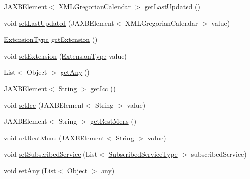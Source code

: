 \begin{DoxyCompactItemize}
\item 
JAXBElement$<$ XMLGregorianCalendar $>$ \hyperlink{classcom_1_1telefonica_1_1schemas_1_1unica_1_1rest_1_1directory_1_1v1_1_1UserProfileType_adfe1cdd7d0f0ebb1148aa5354d510b81}{getLastUpdated} ()
\item 
void \hyperlink{classcom_1_1telefonica_1_1schemas_1_1unica_1_1rest_1_1directory_1_1v1_1_1UserProfileType_a44f5c6a7421966b76f0a155073f76717}{setLastUpdated} (JAXBElement$<$ XMLGregorianCalendar $>$ value)
\item 
\hyperlink{classcom_1_1telefonica_1_1schemas_1_1unica_1_1rest_1_1common_1_1v1_1_1ExtensionType}{ExtensionType} \hyperlink{classcom_1_1telefonica_1_1schemas_1_1unica_1_1rest_1_1directory_1_1v1_1_1UserProfileType_af91c16094b8d692059cd435be7da56bd}{getExtension} ()
\item 
void \hyperlink{classcom_1_1telefonica_1_1schemas_1_1unica_1_1rest_1_1directory_1_1v1_1_1UserProfileType_a57fb9edd6e31a7a852ca3ae31807280e}{setExtension} (\hyperlink{classcom_1_1telefonica_1_1schemas_1_1unica_1_1rest_1_1common_1_1v1_1_1ExtensionType}{ExtensionType} value)
\item 
List$<$ Object $>$ \hyperlink{classcom_1_1telefonica_1_1schemas_1_1unica_1_1rest_1_1directory_1_1v1_1_1UserProfileType_a6dfdbeeca97dbe04196d64d7d497783e}{getAny} ()
\item 
JAXBElement$<$ String $>$ \hyperlink{classcom_1_1telefonica_1_1schemas_1_1unica_1_1rest_1_1directory_1_1v1_1_1UserProfileType_ac70ee6af5160caaa4a887cddde3f735f}{getIcc} ()
\item 
void \hyperlink{classcom_1_1telefonica_1_1schemas_1_1unica_1_1rest_1_1directory_1_1v1_1_1UserProfileType_a5404f810a5f6ea7535568c06aba07ab4}{setIcc} (JAXBElement$<$ String $>$ value)
\item 
JAXBElement$<$ String $>$ \hyperlink{classcom_1_1telefonica_1_1schemas_1_1unica_1_1rest_1_1directory_1_1v1_1_1UserProfileType_a2593acfd38a5d317a921ad551b6404d9}{getRestMens} ()
\item 
void \hyperlink{classcom_1_1telefonica_1_1schemas_1_1unica_1_1rest_1_1directory_1_1v1_1_1UserProfileType_aabb287b8fbe85a24d3465097135428bc}{setRestMens} (JAXBElement$<$ String $>$ value)
\item 
void \hyperlink{classcom_1_1telefonica_1_1schemas_1_1unica_1_1rest_1_1directory_1_1v1_1_1UserProfileType_a3ee328abea13b18fa04eea7ed05dadac}{setSubscribedService} (List$<$ \hyperlink{classcom_1_1telefonica_1_1schemas_1_1unica_1_1rest_1_1directory_1_1v1_1_1SubscribedServiceType}{SubscribedServiceType} $>$ subscribedService)
\item 
void \hyperlink{classcom_1_1telefonica_1_1schemas_1_1unica_1_1rest_1_1directory_1_1v1_1_1UserProfileType_a94e9a636184fa7c80354b5d58ec27ff0}{setAny} (List$<$ Object $>$ any)
\end{DoxyCompactItemize}
